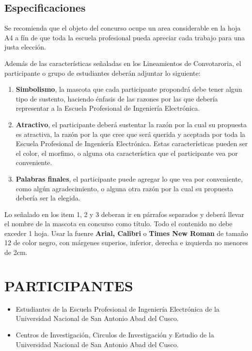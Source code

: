 \documentclass{article}
\begin{document}
\subsection{Especificaciones}
 
 Se recomienda que el objeto del concurso ocupe un area considerable en la hoja A4 a fín de que toda la escuela profesional pueda apreciar cada trabajo para una justa elección.
 
 Además de las características señaladas en los Lineamientos de Convotaroria, el participante o grupo de estudiantes deberán adjuntar lo siguiente:
 
 \begin{enumerate}
 \item \textbf{Simbolismo}, la mascota que cada participante propondrá debe tener algun tipo de sustento, haciendo énfasis de las razones por las que debería representar a la Escuela Profesional de Ingeniería Electrónica.
 \item \textbf{Atractivo}, el participante deberá sustentar la razón por la cual su propuesta es atractiva, la razón por la que cree que será querida y aceptada por toda la Escuela Profesional de Ingeniería Electrónica. Estas características pueden ser el color, el morfimo, o alguna ota característica que el participante vea por conveniente.
 \item \textbf{Palabras finales}, el participante puede agregar lo que vea por conveniente, como algún agradecimiento, o alguna otra razón por la cual su propuesta debería ser la elegida.
 \end{enumerate}
 
 Lo señalado en los item 1, 2 y 3 deberan ir en párrafos separados y deberá llevar el nombre de la mascota en concurso como título. Todo el contenido no debe exceder 1 hoja. Usar la fuenre \textbf{Arial, Calibri} o \textbf{Times New Roman} de tamaño 12 de color negro, con márgenes superios, inferior, derecha e izquierda no menores de 2cm. 
 

\section{PARTICIPANTES}

\begin{itemize}
\item Estudiantes de la Escuela Profesional de Ingeniería Electrónica de la Universidad Nacional de San Antonio Abad del Cusco.
\item Centros de Investigación, Circulos de Investigación y Estudio de la Universidad Nacional de San Antonio Abad del Cusco.
\end{itemize}
\end{document}
